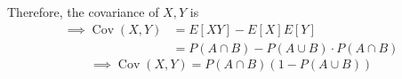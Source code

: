 Therefore, the covariance of \( X, Y \) is
\begin{align*}
    \implies
    \operatorname{Cov}(X, Y)
     & =
    E[XY] - E[X]E[Y]
    \\ & =
    P(A \cap B) - P(A \cup B) \cdot P(A \cap B)
\end{align*}
\begin{equation*}
    \implies
    \boxed{
        \operatorname{Cov}(X, Y)
        =
        P(A \cap B) (1 - P(A \cup B))
    }
\end{equation*}
